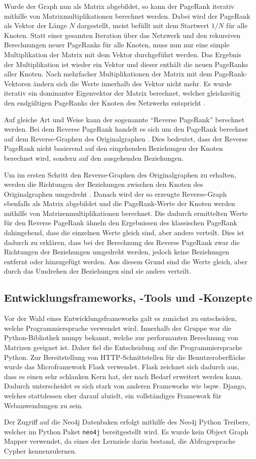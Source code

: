 Wurde der Graph nun als Matrix abgebildet, so kann der PageRank iterativ mithilfe von Matrixmultiplikationen berechnet werden. Dabei wird der PageRank als Vektor der Länge $N$ dargestellt, meist befüllt mit dem Startwert $1/N$ für alle Knoten. Statt einer gesamten Iteration über das Netzwerk und den rekursiven Berechnungen neuer PageRanks für alle Knoten, muss nun nur eine simple Multiplikation der Matrix mit dem Vektor durchgeführt werden. Das Ergebnis der Multiplikation ist wieder ein Vektor und dieser enthält die neuen PageRanks aller Knoten. Nach mehrfacher Multiplikationen der Matrix mit dem PageRank-Vektoren ändern sich die Werte innerhalb des Vektor nicht mehr. Es wurde iterativ ein dominanter Eigenvektor der Matrix berechnet, welcher gleichzeitig den endgültigen PageRanks der Knoten des Netzwerks entspricht \cite{pagerank_eigenvector}.

Auf gleiche Art und Weise kann der sogenannte ``Reverse PageRank'' berechnet werden. Bei dem Reverse PageRank handelt es sich um den PageRank berechnet auf dem Reverse-Graphen des Originalgraphen \cite{reverse_pagerank}. Dies bedeutet, dass der Reverse PageRank nicht basierend auf den eingehenden Beziehungen der Knoten berechnet wird, sondern auf den ausgehenden Beziehungen.

Um im ersten Schritt den Reverse-Graphen des Originalgraphen zu erhalten, werden die Richtungen der Beziehungen zwischen den Knoten des Originalgraphen umgedreht \cite{reverse_pagerank}. Danach wird der so erzeugte Reverse-Graph ebenfalls als Matrix abgebildet und die PageRank-Werte der Knoten werden mithilfe von Matrizenmultiplikationen berechnet. Die dadurch ermittelten Werte für den Reverse PageRank ähneln den Ergebnissen des klassischen PageRank dahingehend, dass die einzelnen Werte gleich sind, aber anders verteilt. Dies ist dadurch zu erklären, dass bei der Berechnung des Reverse PageRank zwar die Richtungen der Beziehungen umgedreht werden, jedoch keine Beziehungen entfernt oder hinzugefügt werden. Aus diesem Grund sind die Werte gleich, aber durch das Umdrehen der Beziehungen sind sie anders verteilt.

\subsection{Entwicklungsframeworks, -Tools und -Konzepte}

Vor der Wahl eines Entwicklungsframeworks galt es zunächst zu entscheiden, welche Programmiersprache verwendet wird.
Innerhalb der Gruppe war die Python-Bibliothek numpy bekannt, welche zur performanten Berechnung von Matrizen geeignet ist.\cite{numpy}
Daher fiel die Entscheidung auf die Programmiersprache Python. Zur Bereitstellung von HTTP-Schnittstellen für die Benutzeroberfläche wurde das Microframework Flask verwendet.
Flask zeichnet sich dadurch aus, dass es einen sehr schlanken Kern hat, der nach Bedarf erweitert werden kann.\cite{flask}
Dadurch unterscheidet es sich stark von anderen Frameworks wie bspw. Django, welches stattdessen eher darauf abzielt, ein vollständiges Framework für Webanwendungen zu sein.\cite{django}

Der Zugriff auf die Neo4j Datenbaken erfolgt mithilfe des Neo4j Python Treibers, welcher im Python Paket \lstinline{neo4j} bereitgestellt wird.\cite{pip_neo4j}
Es wurde kein Object Graph Mapper verwendet, da eines der Lernziele darin bestand, die Abfragesprache Cypher kennenzulernen.


